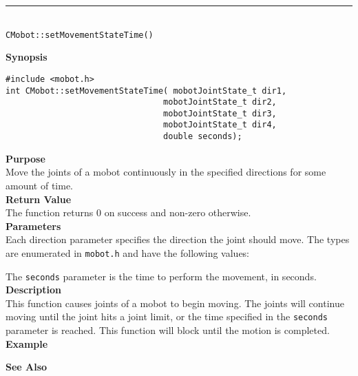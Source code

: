\noindent
\vspace{5pt}
\rule{4.5in}{0.015in}\\
\noindent
{\LARGE \texttt{CMobot::setMovementStateTime()}}\\
{}

\noindent
{\bf Synopsis}
\vspace{-8pt}
\begin{verbatim}
#include <mobot.h>
int CMobot::setMovementStateTime( mobotJointState_t dir1, 
                                mobotJointState_t dir2, 
                                mobotJointState_t dir3, 
                                mobotJointState_t dir4, 
                                double seconds);
\end{verbatim}

\noindent
{\bf Purpose}\\
Move the joints of a mobot continuously in the specified directions for some amount of time.\\

\noindent
{\bf Return Value}\\
The function returns 0 on success and non-zero otherwise.\\

\noindent
{\bf Parameters}\\
Each direction parameter specifies the direction the joint should move. The types
are enumerated in \texttt{mobot.h} and have the following values:

The \texttt{seconds} parameter is the time to perform the movement, in seconds.
\\

\noindent
{\bf Description}\\
This function causes joints of a mobot to begin moving. The joints will continue moving
until the joint hits a joint limit, or the time specified in the \texttt{seconds} parameter
is reached. This function will block until the motion is completed.\\

\noindent
{\bf Example}\\
\noindent

\noindent
{\bf See Also}\\

